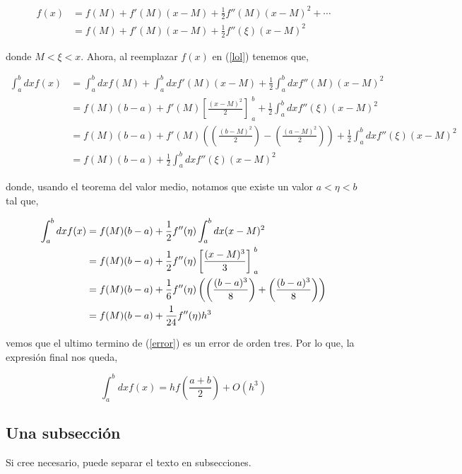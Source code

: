 \documentclass[../portafolio.tex]{subfiles}
\begin{document}
\begin{align}
   f(x)  & = f(M) + f'(M)(x-M) + \frac{1}{2} f''(M)(x-M)^{2} + \cdots  \\
         & = f(M) + f'(M)(x-M) + \frac{1}{2} f''(\xi)(x-M)^{2} \label{lol}
\end{align}

donde $M < \xi < x$. Ahora, al reemplazar $f(x)$ en (\ref{lol}) tenemos que,

\begin{align}
    \int_{a}^{b} dx f(x) & = \int_{a}^{b}dx f(M) + \int_{a}^{b}dx f'(M)(x-M) + \frac{1}{2} \int_{a}^{b}dx f''(M)(x-M)^{2}   \\
                         & = f(M)(b-a) + f'(M) \left[ \frac{(x-M)^{2}}{2} \right]_{\;a}^{\;b} + \frac{1}{2} \int_{a}^{b}dx f''(\xi)(x-M)^{2} \label{T}\\
                         & = f(M)(b-a) + f'(M) \left( \left( \frac{(b-M)^{2}}{2} \right) - \left( \frac{(a-M)^{2}}{2} \right) \right) + \frac{1}{2} \int_{a}^{b}dx f''(\xi)(x-M)^{2}  \\
                         & = f(M)(b-a) + \frac{1}{2} \int_{a}^{b}dx f''(\xi)(x-M)^{2}
\end{align}

donde, usando el teorema del valor medio, notamos que existe un valor $a < \eta < b$ tal que,

\begin{align}
   \int_{a}^{b}dx f(x) & = f(M)(b-a) + \frac{1}{2} f''(\eta) \int_{a}^{b}dx (x-M)^{2} \notag \\
                       & = f(M)(b-a) + \frac{1}{2} f''(\eta) \left[ \frac{(x-M)^{3}}{3} \right]_{\;a}^{\;b} \notag \\
                       & = f(M)(b-a) + \frac{1}{6} f''(\eta) \left( \left( \frac{(b-a)^{3}}{8} \right) + \left( \frac{(b-a)^{3}}{8} \right) \right) \notag \\
                       & = f(M)(b-a) + \frac{1}{24} f''(\eta) h^{3} \label{error}
\end{align}

vemos que el ultimo termino de (\ref{error}) es un error de orden tres. Por lo que, la expresión final nos queda,

\begin{equation}
  \int_{a}^{b}dx f(x) = h f\left(\frac{a+b}{2}\right) + O(h^{3})
\end{equation}

\subsection{Una subsección}

Si cree necesario, puede separar el texto en subsecciones.
\end{document}
